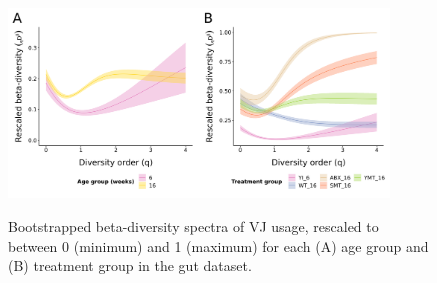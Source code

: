 \begin{figure}
\centering
\includegraphics[width = 0.9\textwidth]{_Figures/png/igseq-gut-VJ-diversity-beta}
\begin{subfigure}{0em}
\label{fig:igseq-gut-VJ-diversity-beta-age}
\end{subfigure}
\begin{subfigure}{0em}
\label{fig:igseq-gut-VJ-diversity-beta-groups}
\end{subfigure}
\caption{Bootstrapped beta-diversity spectra of VJ usage, rescaled to between 0 (minimum) and 1 (maximum) for each (A) age group and (B) treatment group in the \igseq gut dataset.}
\label{fig:igseq-gut-VJ-diversity-beta}
\end{figure}


